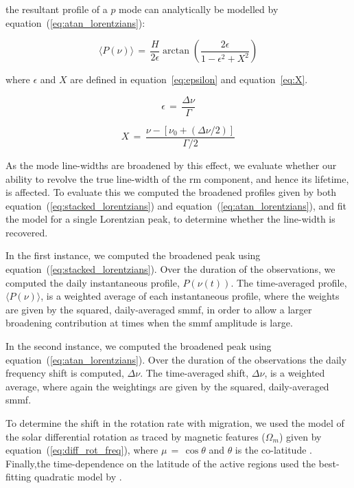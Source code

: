 the resultant profile of a $p$ mode can analytically be modelled by equation~(\ref{eq:atan_lorentzians}):

\begin{equation}
\langle P(\nu) \rangle \, = \, \frac{H}{2\epsilon} \arctan \left( \frac{2 \epsilon}{1 - \epsilon^2 + X^2 } \right)
\label{eq:atan_lorentzians}
\end{equation}

where $\epsilon$ and $X$ are defined in equation~\ref{eq:epsilon} and equation~\ref{eq:X}.

\begin{equation}
\epsilon \, = \, \frac{\Delta\nu}{\Gamma}
\label{eq:epsilon}
\end{equation}

\begin{equation}
X \, = \, \frac{\nu - [\nu_0 + (\Delta\nu/2)]}{\Gamma /2}
\label{eq:X}
\end{equation}

As the mode line-widths are broadened by this effect, we evaluate whether our ability to revolve the true line-width of the \gls{rm} component, and hence its lifetime, is affected. To evaluate this we computed the broadened profiles given by both equation~(\ref{eq:stacked_lorentzians}) and equation~(\ref{eq:atan_lorentzians}), and fit the model for a single Lorentzian peak, to determine whether the line-width is recovered.

In the first instance, we computed the broadened peak using equation~(\ref{eq:stacked_lorentzians}). Over the duration of the observations, we computed the daily instantaneous profile, $P(\nu(t))$. The time-averaged profile, $ \langle P(\nu) \rangle$, is a weighted average of each instantaneous profile, where the weights are given by the squared, daily-averaged \gls{smmf}, in order to allow a larger broadening contribution at times when the \gls{smmf} amplitude is large.

In the second instance, we computed the broadened peak using equation~(\ref{eq:atan_lorentzians}). Over the duration of the observations the daily frequency shift is computed, $\Delta\nu$. The time-averaged shift, $\Delta\nu$, is a weighted average, where again the weightings are given by the squared, daily-averaged \gls{smmf}.

To determine the shift in the rotation rate with migration, we used the model of the solar differential rotation as traced by magnetic features ($\Omega_m$) given by equation~(\ref{eq:diff_rot_freq}), where $\mu \, = \, \cos \theta $ and $\theta$ is the co-latitude \citep{snodgrass_magnetic_1983, brown_inferring_1989}. Finally,the time-dependence on the latitude of the active regions used the best-fitting quadratic model by \cite{li_latitude_2001-1}.


